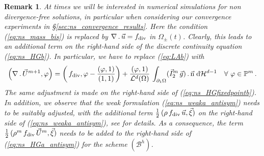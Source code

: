 \documentclass[a4paper,12pt,onecolumn]{article}
\newcommand{\vol}{\mathcal{L}^d}
\newcommand{\dH}[1]{\;{\rm d}{\cal H}^{#1}} %
\newcommand{\pspace}{\mathbb{P}}
\newcommand{\unitn}{\vec{\rm n}}
\newcommand{\schemeB}{{\mathcal{B}^h}}
\newtheorem{rem}[thm]{Remark}
\begin{document}
\begin{rem} \label{rem:nondivfree}
At times we will be interested in numerical simulations for
non divergence-free solutions, in particular when considering our convergence
experiments in \S\ref{sec:ns_convergence_results}. Here the condition
{\rm (\ref{eq:ns_mass_bis})} is replaced by
$\nabla\,.\,\vec u = f_{\rm{div}}$ in $\Omega_\pm(t)$.
Clearly, this leads to an additional term on the right-hand side of the
discrete continuity equation {\rm (\ref{eq:ns_HGb})}. In particular,
we have to replace {\rm (\ref{eq:LAb})} with
\begin{equation}\label{eq:LAb_nondivfree}
\left(\nabla\,.\,\vec U^{m+1}, \varphi\right) =
\left(\,f_{\rm{div}},
\varphi-\frac{\left(\varphi,1\right)}{\left(1,1\right)}\right)+
\frac{\left(\varphi, 1\right)}{\vol(\Omega)}\, \int_{\partial_1\Omega}
(\vec I^m_2\,\vec g) \,.\, \unitn \dH{d-1} \quad \forall\ \varphi \in
\pspace^m\,.
\end{equation}
The same adjustment is made on the right-hand side of
{\rm (\ref{eq:ns_HGfixedpointb})}.
In addition, we observe that the weak formulation
{\rm (\ref{eq:ns_weaka_antisym})} needs to be suitably adjusted,
with the additional term $\tfrac{1}{2}\,(\rho\,f_{\rm{div}}\,\vec u,\vec\xi)$
on the right-hand side of {\rm (\ref{eq:ns_weaka_antisym})}, see
\cite{Agnese} for details.
As a consequence, the term
$\frac12\,(\rho^m\,f_{\rm{div}}\,\vec U^m,\vec\xi)$ needs to be added
to the right-hand side of {\rm (\ref{eq:ns_HGa_antisym})} for the scheme
$(\schemeB)$.
\end{rem}
\end{document}
